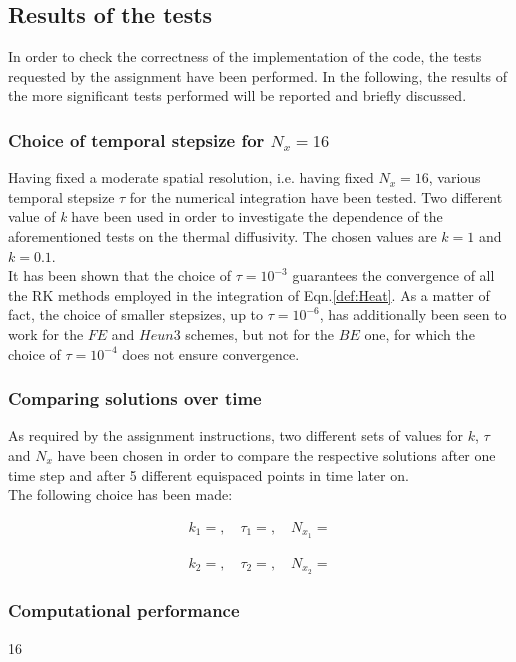 \documentclass[11pt]{article}
\theoremstyle{theorem}
\theoremstyle{definition}
\begin{document}
\subsection{Results of the tests}
In order to check the correctness of the implementation of the code, the tests requested by the assignment have been performed. In the following, the results of the more significant tests performed will be reported and briefly discussed.\\

\subsubsection{Choice of temporal stepsize for $N_x=16$}
Having fixed a moderate spatial resolution, i.e. having fixed $N_x=16$, various temporal stepsize $\tau$ for the numerical integration have been tested. Two different value of \emph{k} have been used in order to investigate the dependence of the aforementioned tests on the thermal diffusivity. The chosen values are $k=1$ and $k=0.1$.\\
It has been shown that the choice of $\tau=10^{-3}$ guarantees the convergence of all the RK methods employed in the integration of Eqn.\ref{def:Heat}. As a matter of fact, the choice of smaller stepsizes, up to $\tau=10^{-6}$, has additionally been seen to work for the $FE$ and $Heun3$ schemes, but not for the $BE$ one, for which the choice of $\tau=10^{-4}$ does not ensure convergence.\\ 

\subsubsection{Comparing solutions over time}
As required by the assignment instructions, two different sets of values for $k$, $\tau$ and $N_x$ have been chosen in order to compare the respective solutions after one time step and after 5 different equispaced points in time later on.\\
The following choice has been made:

\begin{align}
	\label{eqn:set-1}
	k_1=, \quad\tau_1=, \quad N_{x_1}=
\end{align}

\begin{align}
\label{eqn:set-2}
k_2=, \quad\tau_2=, \quad N_{x_2}=
\end{align} 

\subsubsection{Computational performance}
16 
\end{document}
